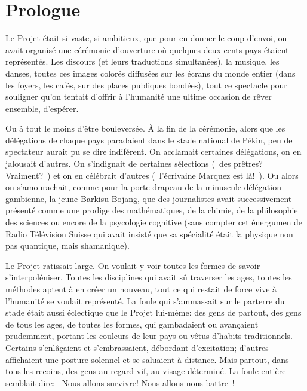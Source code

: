\chapter*{Prologue}

Le Projet était si vaste, si ambitieux,
que pour en donner le coup d'envoi, on avait organisé une cérémonie d'ouverture
où quelques deux cents pays étaient représentés.  
%
Les discours (et leurs traductions simultanées), la musique, les danses, toutes
ces images colorés diffusées sur les écrans du monde entier (dans les foyers,
les cafés, sur des places publiques bondées), tout ce spectacle pour souligner
qu'on tentait d'offrir à l'humanité une ultime occasion de rêver
ensemble, d'espérer.

Ou à tout le moins d'être bouleversée.
%
À la fin de la cérémonie, alors que les délégations de chaque pays 
paradaient dans le stade national de Pékin, peu de spectateur aurait pu se dire
indiférent.
%
On acclamait certaines délégations, on en jalousait d'autres.  
%
On s'indignait de certaines sélections (\og~des prêtres? Vraiment?~\fg)
et on en célébrait d'autres (\og~l'écrivaine Marquez est là!~\fg).
%
Ou alors on s'amourachait, comme pour la porte drapeau de la minuscule délégation
gambienne, la jeune Barkisu Bojang, que des journalistes avait successivement
présenté comme une prodige des mathématiques, de la chimie, de la philosophie
des sciences ou encore de la psycologie cognitive (sans compter cet énergumen de Radio
Télévision Suisse qui avait insisté que sa spécialité était la physique non pas
quantique, mais shamanique).

Le Projet ratissait large.  
%
On voulait y voir toutes les formes de savoir s'interpoléniser. 
%
Toutes les disciplines qui avait sû traverser les ages, toutes les méthodes
aptent à en créer un nouveau, tout ce qui restait de force vive à l'humanité se
voulait représenté.
%
La foule qui s'ammassait sur le parterre du stade était aussi éclectique que le
Projet lui-même: des gens de partout, des gens de tous les ages, de toutes les
formes, qui gambadaient ou avançaient prudemment, portant les couleurs de leur
pays ou vêtus d'habits traditionnels. 
%
Certains s'enlâçaient et s'embrassaient, débordant d'excitation; d'autres
affichaient une posture solennel et se saluaient à distance.
%
Mais partout, dans tous les recoins, des gens au regard vif, au visage
déterminé.
%
La foule entière semblait dire: \og~Nous allons survivre! Nous allons nous
battre~\fg!

